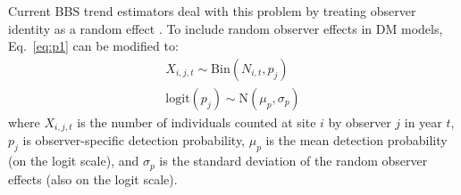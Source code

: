 \documentclass[12pt]{article}
\begin{document}
Current BBS trend estimators deal with this problem by
treating observer identity as a random %
effect \citep{link_sauer:2002,sauer_link:2011}.
%
To include random observer effects in DM models, 
Eq.~\ref{eq:p1} can be modified to:
\begin{gather}
X_{i,j,t} \sim \mathrm{Bin}(N_{i,t}, p_j) \nonumber \\
\mathrm{logit}(p_j) \sim \mathrm{N}(\mu_p, \sigma_p)
\label{eq:pobs}
\end{gather}
where $X_{i,j,t}$ is the number of individuals counted at site $i$ by
observer $j$ in year $t$, $p_j$ is observer-specific detection probability,
$\mu_p$ is the mean detection probability (on the logit scale), and $\sigma_p$ is
the standard deviation of the random observer effects (also on the logit scale). 




\end{document}
